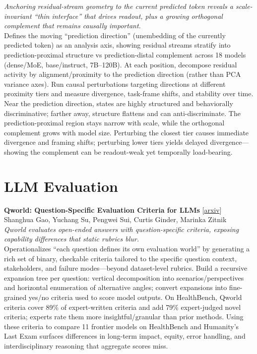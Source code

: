 \documentclass[12pt,letterpaper]{article}
\begin{document}
{\small\textit{Anchoring residual-stream geometry to the current predicted token reveals a scale-invariant ``thin interface'' that drives readout, plus a growing orthogonal complement that remains causally important.}}\\[1pt]
{\footnotesize Defines the moving ``prediction direction'' (unembedding of the currently predicted token) as an analysis axis, showing residual streams stratify into prediction-proximal structure vs prediction-distal complement across 18 models (dense/MoE, base/instruct, 7B--120B). At each position, decompose residual activity by alignment/proximity to the prediction direction (rather than PCA variance axes). Run causal perturbations targeting directions at different proximity tiers and measure divergence, task-frame shifts, and stability over time. Near the prediction direction, states are highly structured and behaviorally discriminative; farther away, structure flattens and can anti-discriminate. The prediction-proximal region stays narrow with scale, while the orthogonal complement grows with model size. Perturbing the closest tier causes immediate divergence and framing shifts; perturbing lower tiers yields delayed divergence---showing the complement can be readout-weak yet temporally load-bearing.}

\medskip


\section*{LLM Evaluation}

{\small\textbf{Qworld: Question-Specific Evaluation Criteria for LLMs}} {\scriptsize[\href{https://arxiv.org/abs/2603.23522}{arxiv}]}\\
{\scriptsize Shanghua Gao, Yuchang Su, Pengwei Sui, Curtis Ginder, Marinka Zitnik}\\

{\small\textit{Qworld evaluates open-ended answers with question-specific criteria, exposing capability differences that static rubrics blur.}}\\[1pt]
{\footnotesize Operationalizes ``each question defines its own evaluation world'' by generating a rich set of binary, checkable criteria tailored to the specific question context, stakeholders, and failure modes---beyond dataset-level rubrics. Build a recursive expansion tree per question: vertical decomposition into scenarios/perspectives and horizontal enumeration of alternative angles; convert expansions into fine-grained yes/no criteria used to score model outputs. On HealthBench, Qworld criteria cover 89\% of expert-written criteria and add 79\% expert-judged novel criteria; experts rate them more insightful/granular than prior methods. Using these criteria to compare 11 frontier models on HealthBench and Humanity's Last Exam surfaces differences in long-term impact, equity, error handling, and interdisciplinary reasoning that aggregate scores miss.}
\end{document}
